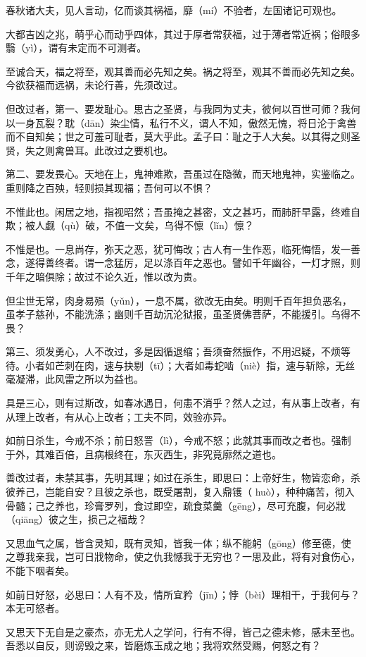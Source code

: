 \documentclass[12pt,UTF8]{ctexbook}
\begin{document}
春秋诸大夫，见人言动，亿而谈其祸福，靡（mí）不验者，左国诸记可观也。

大都吉凶之兆，萌乎心而动乎四体，其过于厚者常获福，过于薄者常近祸；俗眼多翳（yì），谓有未定而不可测者。

至诚合天，福之将至，观其善而必先知之矣。祸之将至，观其不善而必先知之矣。今欲获福而远祸，未论行善，先须改过。

但改过者，第一、要发耻心。思古之圣贤，与我同为丈夫，彼何以百世可师？我何以一身瓦裂？耽（dān）染尘情，私行不义，谓人不知，傲然无愧，将日沦于禽兽而不自知矣；世之可羞可耻者，莫大乎此。孟子曰：耻之于人大矣。以其得之则圣贤，失之则禽兽耳。此改过之要机也。

第二、要发畏心。天地在上，鬼神难欺，吾虽过在隐微，而天地鬼神，实鉴临之。重则降之百殃，轻则损其现福；吾何可以不惧？

不惟此也。闲居之地，指视昭然；吾虽掩之甚密，文之甚巧，而肺肝早露，终难自欺；被人觑（qù）破，不值一文矣，乌得不懔（lǐn）懔？

不惟是也。一息尚存，弥天之恶，犹可悔改；古人有一生作恶，临死悔悟，发一善念，遂得善终者。谓一念猛厉，足以涤百年之恶也。譬如千年幽谷，一灯才照，则千年之暗俱除；故过不论久近，惟以改为贵。

但尘世无常，肉身易殒（yǔn），一息不属，欲改无由矣。明则千百年担负恶名，虽孝子慈孙，不能洗涤；幽则千百劫沉沦狱报，虽圣贤佛菩萨，不能援引。乌得不畏？

第三、须发勇心，人不改过，多是因循退缩；吾须奋然振作，不用迟疑，不烦等待。小者如芒刺在肉，速与抉剔（tī）；大者如毒蛇啮（niè）指，速与斩除，无丝毫凝滞，此风雷之所以为益也。

具是三心，则有过斯改，如春冰遇日，何患不消乎？然人之过，有从事上改者，有从理上改者，有从心上改者；工夫不同，效验亦异。

如前日杀生，今戒不杀；前日怒詈（lì），今戒不怒；此就其事而改之者也。强制于外，其难百倍，且病根终在，东灭西生，非究竟廓然之道也。

善改过者，未禁其事，先明其理；如过在杀生，即思曰：上帝好生，物皆恋命，杀彼养己，岂能自安？且彼之杀也，既受屠割，复入鼎镬（ huò），种种痛苦，彻入骨髓；己之养也，珍膏罗列，食过即空，疏食菜羹（gēng），尽可充腹，何必戕（qiāng）彼之生，损己之福哉？

又思血气之属，皆含灵知，既有灵知，皆我一体；纵不能躬（gōng）修至德，使之尊我亲我，岂可日戕物命，使之仇我憾我于无穷也？一思及此，将有对食伤心，不能下咽者矣。

如前日好怒，必思曰：人有不及，情所宜矜（jīn）；悖（bèi）理相干，于我何与？本无可怒者。

又思天下无自是之豪杰，亦无尤人之学问，行有不得，皆己之德未修，感未至也。吾悉以自反，则谤毁之来，皆磨炼玉成之地；我将欢然受赐，何怒之有？
\end{document}
